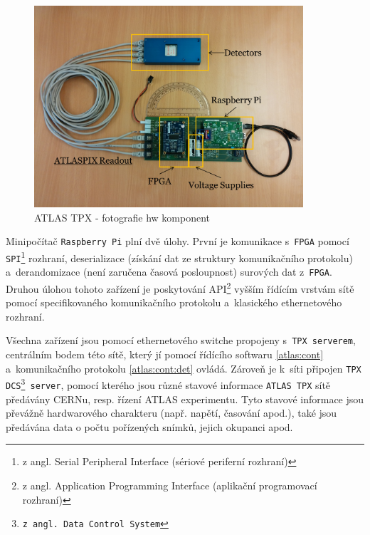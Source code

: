 \begin{figure}[t]
	\begin{center}
		\includegraphics[width=10cm]{figures/tpx_hw_foto.png}
		\caption{ATLAS TPX - fotografie hw komponent}
		\label{fig:tpx_hw_foto}
	\end{center}
\end{figure}

Minipočítač \texttt{Raspberry Pi} plní dvě úlohy. První je komunikace s~\texttt{FPGA} pomocí \texttt{SPI}\footnote{z angl. Serial Peripheral Interface (sériové periferní rozhraní)} rozhraní, deserializace (získání dat ze struktury komunikačního protokolu) a~derandomizace (není zaručena časová posloupnost) surových dat z~\texttt{FPGA}. Druhou úlohou tohoto zařízení je poskytování API\footnote{z angl. Application Programming Interface (aplikační programovací rozhraní)} vyšším řídícím vrstvám sítě pomocí specifikovaného komunikačního protokolu a~klasického ethernetového rozhraní.

Všechna zařízení jsou pomocí ethernetového switche propojeny s~\texttt{TPX serverem}, centrálním bodem této sítě, který jí pomocí řídícího softwaru \ref{atlas:cont} a~komunikačního protokolu \ref{atlas:cont:det} ovládá. Zároveň je k~síti připojen \texttt{TPX DCS\footnote{z angl. Data Control System} server}, pomocí kterého jsou různé stavové informace \texttt{ATLAS TPX} sítě předávány CERNu, resp. řízení ATLAS experimentu. Tyto stavové informace jsou převážně hardwarového charakteru (např. napětí, časování apod.), také jsou předávána data o počtu pořízených snímků, jejich okupanci apod.


\newpage
